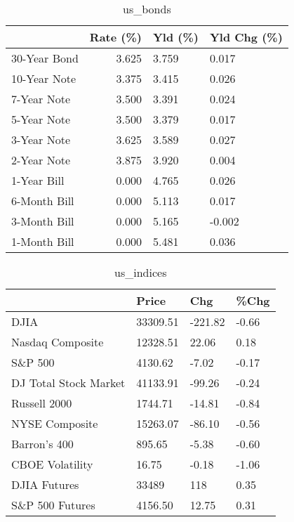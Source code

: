 \documentclass{article}%
\begin{document}
%


\begin{table}[htbp]%
\caption{us\_bonds}%
\centering%
\begin{adjustbox}{width=1\textwidth}%
\begin{tabular}{lrll}
\toprule
             &  Rate (\%) & Yld (\%) & Yld Chg (\%) \\
\midrule
30-Year Bond &     3.625 &   3.759 &       0.017 \\
10-Year Note &     3.375 &   3.415 &       0.026 \\
 7-Year Note &     3.500 &   3.391 &       0.024 \\
 5-Year Note &     3.500 &   3.379 &       0.017 \\
 3-Year Note &     3.625 &   3.589 &       0.027 \\
 2-Year Note &     3.875 &   3.920 &       0.004 \\
 1-Year Bill &     0.000 &   4.765 &       0.026 \\
6-Month Bill &     0.000 &   5.113 &       0.017 \\
3-Month Bill &     0.000 &   5.165 &      -0.002 \\
1-Month Bill &     0.000 &   5.481 &       0.036 \\
\bottomrule
\end{tabular}
%
\end{adjustbox}%
\end{table}

%


\begin{table}[htbp]%
\caption{us\_indices}%
\centering%
\begin{adjustbox}{width=1\textwidth}%
\begin{tabular}{llll}
\toprule
                      &    Price &     Chg &  \%Chg \\
\midrule
                 DJIA & 33309.51 & -221.82 & -0.66 \\
     Nasdaq Composite & 12328.51 &   22.06 &  0.18 \\
              S\&P 500 &  4130.62 &   -7.02 & -0.17 \\
DJ Total Stock Market & 41133.91 &  -99.26 & -0.24 \\
         Russell 2000 &  1744.71 &  -14.81 & -0.84 \\
       NYSE Composite & 15263.07 &  -86.10 & -0.56 \\
         Barron's 400 &   895.65 &   -5.38 & -0.60 \\
      CBOE Volatility &    16.75 &   -0.18 & -1.06 \\
         DJIA Futures &    33489 &     118 &  0.35 \\
      S\&P 500 Futures &  4156.50 &   12.75 &  0.31 \\
\bottomrule
\end{tabular}
%
\end{adjustbox}%
\end{table}
\end{document}
